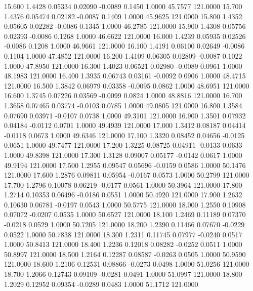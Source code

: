   15.600   1.4428   0.05334   0.02090  -0.0089   0.1450   1.0000  45.7577 121.0000
  15.700   1.4376   0.05474   0.02182  -0.0087   0.1409   1.0000  45.9625 121.0000
  15.800   1.4352   0.05605   0.02282  -0.0086   0.1345   1.0000  46.2785 121.0000
  15.900   1.4308   0.05756   0.02393  -0.0086   0.1268   1.0000  46.6622 121.0000
  16.000   1.4239   0.05935   0.02526  -0.0086   0.1208   1.0000  46.9661 121.0000
  16.100   1.4191   0.06100   0.02649  -0.0086   0.1104   1.0000  47.4852 121.0000
  16.200   1.4109   0.06305   0.02809  -0.0087   0.1022   1.0000  47.8950 121.0000
  16.300   1.4023   0.06521   0.02980  -0.0089   0.0961   1.0000  48.1983 121.0000
  16.400   1.3935   0.06743   0.03161  -0.0092   0.0906   1.0000  48.4715 121.0000
  16.500   1.3842   0.06979   0.03358  -0.0095   0.0862   1.0000  48.6951 121.0000
  16.600   1.3745   0.07226   0.03569  -0.0099   0.0824   1.0000  48.8816 121.0000
  16.700   1.3658   0.07465   0.03774  -0.0103   0.0785   1.0000  49.0805 121.0000
  16.800   1.3584   0.07690   0.03971  -0.0107   0.0738   1.0000  49.3101 121.0000
  16.900   1.3501   0.07932   0.04184  -0.0112   0.0701   1.0000  49.4939 121.0000
  17.000   1.3412   0.08187   0.04414  -0.0118   0.0673   1.0000  49.6346 121.0000
  17.100   1.3320   0.08452   0.04656  -0.0125   0.0651   1.0000  49.7477 121.0000
  17.200   1.3225   0.08725   0.04911  -0.0133   0.0633   1.0000  49.8398 121.0000
  17.300   1.3128   0.09007   0.05177  -0.0142   0.0617   1.0000  49.9194 121.0000
  17.500   1.2955   0.09547   0.05696  -0.0159   0.0586   1.0000  50.1476 121.0000
  17.600   1.2876   0.09811   0.05954  -0.0167   0.0573   1.0000  50.2799 121.0000
  17.700   1.2796   0.10078   0.06219  -0.0177   0.0561   1.0000  50.3964 121.0000
  17.800   1.2714   0.10353   0.06496  -0.0186   0.0551   1.0000  50.4920 121.0000
  17.900   1.2632   0.10630   0.06781  -0.0197   0.0543   1.0000  50.5775 121.0000
  18.000   1.2550   0.10908   0.07072  -0.0207   0.0535   1.0000  50.6527 121.0000
  18.100   1.2469   0.11189   0.07370  -0.0218   0.0529   1.0000  50.7205 121.0000
  18.200   1.2390   0.11466   0.07670  -0.0229   0.0522   1.0000  50.7838 121.0000
  18.300   1.2311   0.11745   0.07977  -0.0240   0.0517   1.0000  50.8413 121.0000
  18.400   1.2236   0.12018   0.08282  -0.0252   0.0511   1.0000  50.8997 121.0000
  18.500   1.2164   0.12287   0.08587  -0.0263   0.0505   1.0000  50.9590 121.0000
  18.600   1.2106   0.12531   0.08866  -0.0273   0.0498   1.0000  51.0256 121.0000
  18.700   1.2066   0.12743   0.09109  -0.0281   0.0491   1.0000  51.0997 121.0000
  18.800   1.2029   0.12952   0.09354  -0.0289   0.0483   1.0000  51.1712 121.0000
